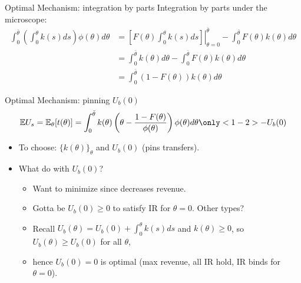 \documentclass[english,10pt
,aspectratio=169
]{beamer}
\begin{document}
\begin{frame}{Optimal Mechanism: integration by parts}
Integration by parts under the microscope:
\begin{align*}
	\int_0^{\bar{\theta}} \left( \int_0^\theta k(s) ds \right) \phi(\theta) d\theta &= \left. \left[F(\theta) \int_0^\theta k(s) ds \right] \right|_{\theta=0}^{\bar{\theta}} - \int_0^{\bar{\theta}} F(\theta) k(\theta) d\theta
	\\ &= \int_0^{\bar{\theta}} k(\theta) d\theta - \int_0^{\bar{\theta}} F(\theta) k(\theta) d\theta
	\\ &= \int_0^{\bar{\theta}} (1-F(\theta)) k(\theta) d\theta
\end{align*}
\end{frame}


\begin{frame}{Optimal Mechanism: pinning $U_b(0)$}
\begin{equation*}
	\mathbb{E} U_s = \mathbb{E}_\theta [ t(\theta) ] = \int_0^{\bar{\theta}} k(\theta) \left( \theta - \frac{1-F(\theta)}{\phi(\theta)} \right) \phi(\theta) d\theta \only<1-2>{- U_b(0)} %
\end{equation*}
\begin{itemize}
	\item To choose: $\{k(\theta)\}_\theta$ and $U_b(0)$ (pins transfers).
	\pause
	\item What do with $U_b(0)$?
	\begin{itemize}
		\item Want to minimize since decreases revenue.
		\item Gotta be $U_b(0) \geq 0$ to satisfy IR for $\theta = 0$. Other types?
		\pause
		\item Recall $U_b(\theta) = U_b(0) + \int_0^\theta k(s) ds$ and $k(\theta) \geq 0$, so $U_b(\theta)\geq U_b(0)$ for all $\theta$, 
		\item hence $U_b(0) = 0$ is optimal (max revenue, all IR hold, IR binds for $\theta=0$).
	\end{itemize}
\end{itemize}
\end{frame}
\end{document}
